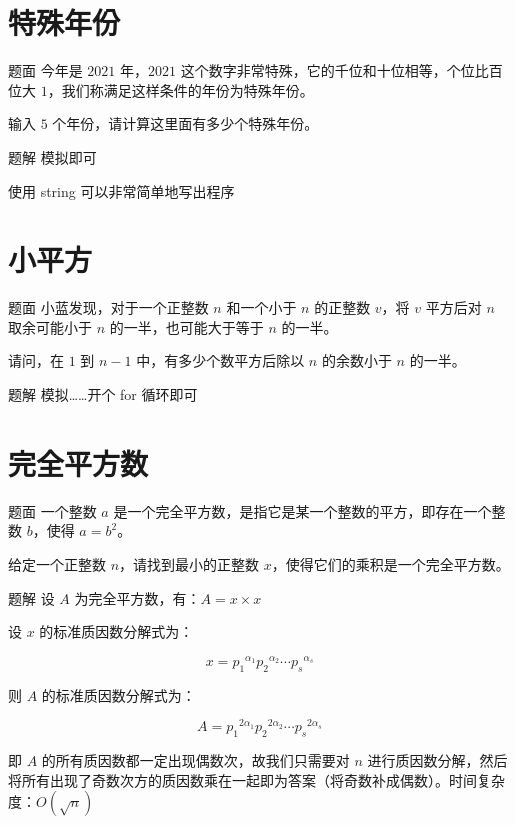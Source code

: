 \documentclass{pptt}
\begin{document}
\section{特殊年份}

\begin{frame}{题面}
    今年是 $2021$ 年，$2021$ 这个数字非常特殊，它的千位和十位相等，个位比百位大 $1$，我们称满足这样条件的年份为特殊年份。

    输入 $5$ 个年份，请计算这里面有多少个特殊年份。
\end{frame}

\begin{frame}{题解}
    模拟即可

    使用 string 可以非常简单地写出程序
\end{frame}

\section{小平方}

\begin{frame}{题面}
    小蓝发现，对于一个正整数 $n$ 和一个小于 $n$ 的正整数 $v$，将 $v$ 平方后对 $n$ 取余可能小于 $n$ 的一半，也可能大于等于 $n$ 的一半。

    请问，在 $1$ 到 $n-1$ 中，有多少个数平方后除以 $n$ 的余数小于 $n$ 的一半。
\end{frame}

\begin{frame}{题解}
    模拟……开个 for 循环即可
\end{frame}

\section{完全平方数}

\begin{frame}{题面}
    一个整数 $a$ 是一个完全平方数，是指它是某一个整数的平方，即存在一个整数 $b$，使得 $a=b^2$。

    给定一个正整数 $n$，请找到最小的正整数 $x$，使得它们的乘积是一个完全平方数。
\end{frame}

\begin{frame}{题解}
    设 $A$ 为完全平方数，有：$A=x \times x$

    设 $x$ 的标准质因数分解式为：

    $$x={p_1}^{\alpha_1}{p_2}^{\alpha_2} \cdots {p_s}^{\alpha_s}$$

    则 $A$ 的标准质因数分解式为：

    $$A={p_1}^{2\alpha_1}{p_2}^{2\alpha_2} \cdots {p_s}^{2\alpha_s}$$

    即 $A$ 的所有质因数都一定出现偶数次，故我们只需要对 $n$ 进行质因数分解，然后将所有出现了奇数次方的质因数乘在一起即为答案（将奇数补成偶数）。时间复杂度：$O(\sqrt{n})$
\end{frame}
\end{document}
